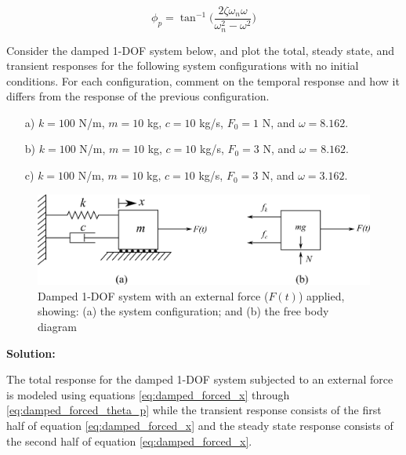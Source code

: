 \documentclass[12pt,letter]{article}
\begin{document}
	\begin{equation}
		\phi_p = \tan^{-1} \bigg(\frac{2\zeta \omega_n \omega}{\omega_n^2 - \omega^2}\bigg)
		\label{eq:damped_forced_theta_p}
	\end{equation}		
	\begin{example}
	\label{ex:homogeneous_and_particular_solutions_in_resonance}		
		Consider the damped 1-DOF system below, and plot the total, steady state, and transient responses for the following system configurations with no initial conditions. For each configuration, comment on the temporal response and how it differs from the response of the previous configuration.    
		
		\begin{itemize}
		\item[a)] $k=100$ N/m, $m=10$ kg,  $c=10$ kg/s, $F_0=1$ N, and $\omega = 8.162$.
		\item[b)] $k=100$ N/m, $m=10$ kg,  $c=10$ kg/s, $F_0=3$ N, and $\omega = 8.162$.
		\item[c)] $k=100$ N/m, $m=10$ kg,  $c=10$ kg/s, $F_0=3$ N, and $\omega = 3.162$.
		\end{itemize}
		
		\begin{figure}[H]
			\centering
			\includegraphics[]{../figures/1-DOF-spring_dashpot_mass_horizontal_forced_FBD.png}
			\caption{Damped 1-DOF system with an external force ($F(t)$) applied, showing: (a) the system configuration; and (b) the free body diagram}
		\end{figure}
		
		\noindent\textbf{Solution:} 

		The total response for the damped 1-DOF system subjected to an external force is modeled using equations \ref{eq:damped_forced_x} through \ref{eq:damped_forced_theta_p} while the transient response consists of the first half of equation \ref{eq:damped_forced_x} and the steady state response consists of the second half of equation \ref{eq:damped_forced_x}.  
		

\end{example}
\end{document}
